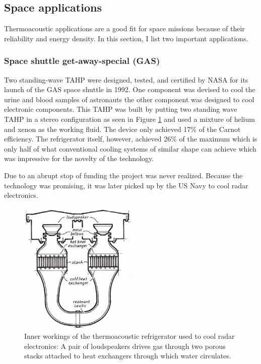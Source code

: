 \documentclass[a4paper]{article}
\newcommand{\newpara}
    {
      \bigbreak{}
      \noindent
    }
\begin{document}
\subsection{Space applications}
Thermoacoustic applications are a good fit for space missions because of their reliability and energy density. In this section, I list two important applications.
\subsubsection{Space shuttle get-away-special (GAS)\cite{AdeffSpace,powerofsound}}
Two standing-wave TAHP were designed, tested, and certified by NASA for its launch of the GAS space shuttle in 1992. One component was devised to cool the urine and blood samples of astronauts the other component was designed to cool electronic components.
This TAHP was built by putting two standing wave TAHP in a stereo configuration as seen in Figure \ref{stereoStandingWave} and used a mixture of helium and xenon as the working fluid. The device only achieved 17\% of the Carnot efficiency. The refrigerator itself, however, achieved 26\% of the maximum which is only half of what conventional cooling systems of similar shape can achieve which was impressive for the novelty of the technology.
\newpara{}
Due to an abrupt stop of funding the project was never realized. Because the technology was promising, it was later picked up by the US Navy to cool radar electronics.
\begin{figure}[h]
  \centering
  \includegraphics[width=0.5\textwidth]{images/powerofsound/stereo.png}
  \caption{Inner workings of the thermoacoustic refrigerator used to cool radar electronics: A pair of loudspeakers drives gas through two porous stacks attached to heat exchangers through which water circulates.\cite{powerofsound}}\label{stereoStandingWave}
\end{figure}
\end{document}
